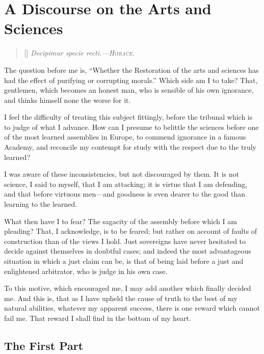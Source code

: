 
\author{Jean-Jacques Rousseau}
\chapter{A Discourse on the Arts and Sciences}

\settowidth{}
\begin{verse}[\versewidth]
\textit{Decipimur specie recti.---\normalfont\textsc{Horace}.}
\end{verse}

\noindent The question before me is, ``Whether the Restoration of the
arts and sciences has had the effect of purifying or corrupting
morals.'' Which side am I to take? That, gentlemen, which becomes an
honest man, who is sensible of his own ignorance, and thinks himself
none the worse for it.

I feel the difficulty of treating this subject fittingly, before the
tribunal which is to judge of what I advance. How can I presume to
belittle the sciences before one of the most learned assemblies in
Europe, to commend ignorance in a famous Academy, and reconcile my
contempt for study with the respect due to the truly learned?

I was aware of these inconsistencies, but not discouraged by them. It
is not science, I said to myself, that I am attacking; it is virtue
that I am defending, and that before virtuous men---and goodness is
even dearer to the good than learning to the learned.

What then have I to fear? The sagacity of the assembly before which I
am pleading? That, I acknowledge, is to be feared; but rather on
account of faults of construction than of the views I hold. Just
sovereigns have never hesitated to decide against themselves in
doubtful cases; and indeed the most advantageous situation in which a
just claim can be, is that of being laid before a just and enlightened
arbitrator, who is judge in his own case.

To this motive, which encouraged me, I may add another which finally
decided me. And this is, that as I have upheld the cause of truth to
the best of my natural abilities, whatever my apparent success, there
is one reward which cannot fail me. That reward I shall find in the
bottom of my heart.

\section{The First Part}

